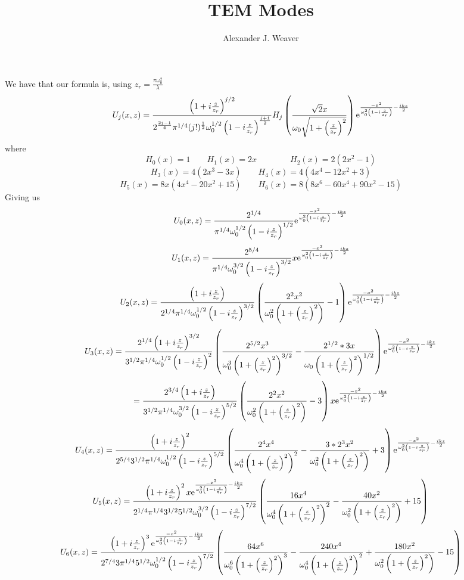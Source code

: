 \documentclass[11pt]{amsart}
\title{TEM Modes}
\author{Alexander J. Weaver}
\date{}                 		  %
\makeatletter
\newcommand{\e}{{\rm e}}				%
\newcommand{\0}{\varnothing}		%
\newcommand{\1}{!}
\newcommand{\2}{@}
\newcommand{\3}{\#}
\newcommand{\4}{\$}
\newcommand{\5}{\%}
\newcommand{\6}{$^\wedge$}
\newcommand{\7}{\&}
\newcommand{\8}{*}
\newcommand{\9}{(}
\makeatother
\begin{document}
\maketitle
We have that our formula is, using $z_r = \frac{\pi\omega_0^2}{\lambda}$
\[
U_j(x,z) = \frac{\left(1+i\frac{z}{z_r}\right)^{j/2}}{2^{\frac{2j-1}{4}}\pi^{1/4}(j!)^{\frac{1}{2}}\omega_0^{1/2}\left(1-i\frac{z}{z_r}\right)^{\frac{j+1}{2}}}H_j\left(\frac{\sqrt{2}x}{\omega_0\sqrt{1+\left(\frac{z}{z_r}\right)^2}}\right)\e^{\frac{-x^2}{\omega_0^2\left(1-i\frac{z}{z_r}\right)}-\frac{ikz}{2}}
\]
where
\[
H_0(x) = 1\qquad H_1(x) = 2x\qquad \qquad H_2(x) = 2\left(2x^2-1\right)
\]
\[
H_3(x) = 4\left(2x^3-3x\right)\qquad H_4(x) = 4\left(4x^4-12x^2+3\right)
\]
\[
H_5(x) = 8x\left(4x^4-20x^2+15\right)\qquad H_6(x) = 8(8x^6 - 60x^4+90x^2-15)
\]
Giving us
\[
U_0(x,z) = \frac{2^{1/4}}{\pi^{1/4}\omega_0^{1/2}\left(1-i\frac{z}{z_r}\right)^{1/2}}\e^{\frac{-x^2}{\omega_0^2\left(1-i\frac{z}{z_r}\right)}-\frac{ikz}{2}}
\]
\[
 U_1(x,z) =\frac{2^{5/4}}{\pi^{1/4}\omega_0^{3/2}\left(1-i\frac{z}{z_r}\right)^{3/2}}x\e^{\frac{-x^2}{\omega_0^2\left(1-i\frac{z}{z_r}\right)}-\frac{ikz}{2}}
\]
\[
U_2(x,z) = \frac{\left(1+i\frac{z}{z_r}\right)}{2^{1/4}\pi^{1/4}\omega_0^{1/2}\left(1-i\frac{z}{z_r}\right)^{3/2}}\left(\frac{2^2x^2}{\omega_0^2\left(1+\left(\frac{z}{z_r}\right)^2\right)}-1\right)\e^{\frac{-x^2}{\omega_0^2\left(1-i\frac{z}{z_r}\right)}-\frac{ikz}{2}}
\]
\[
U_3(x,z)=\frac{2^{1/4}\left(1+i\frac{z}{z_r}\right)^{3/2}}{3^{1/2}\pi^{1/4}\omega_0^{1/2}\left(1-i\frac{z}{z_r}\right)^2}\left(\frac{2^{5/2}x^3}{\omega_0^3\left(1+\left(\frac{z}{z_r}\right)^2\right)^{3/2}}-\frac{2^{1/2}*3x}{\omega_0\left(1+\left(\frac{z}{z_r}\right)^2\right)^{1/2}}\right)\e^{\frac{-x^2}{\omega_0^2\left(1-i\frac{z}{z_r}\right)}-\frac{ikz}{2}}
\]
\[
=\frac{2^{3/4}\left(1+i\frac{z}{z_r}\right)}{3^{1/2}\pi^{1/4}\omega_0^{3/2}\left(1-i\frac{z}{z_r}\right)^{5/2}}\left(\frac{2^2x^2}{\omega_0^2\left(1+\left(\frac{z}{z_r}\right)^2\right)}-3\right)x\e^{\frac{-x^2}{\omega_0^2\left(1-i\frac{z}{z_r}\right)}-\frac{ikz}{2}}
\]
\[
U_4(x,z) = \frac{\left(1+i\frac{z}{z_r}\right)^2}{2^{5/4}3^{1/2}\pi^{1/4}\omega_0^{1/2}\left(1-i\frac{z}{z_r}\right)^{5/2}}\left(\frac{2^4x^4}{\omega_0^4\left(1+\left(\frac{z}{z_r}\right)^2\right)^2}-\frac{3*2^3x^2}{\omega_0^2\left(1+\left(\frac{z}{z_r}\right)^2\right)}+3\right)\e^{\frac{-x^2}{\omega_0^2\left(1-i\frac{z}{z_r}\right)}-\frac{ikz}{2}}
\]
\[
U_5(x,z) = \frac{\left(1+i\frac{z}{z_r}\right)^{2}x\e^{\frac{-x^2}{\omega_0^2\left(1-i\frac{z}{z_r}\right)}-\frac{ikz}{2}}}{2^{1/4}\pi^{1/4}3^{1/2}5^{1/2}\omega_0^{3/2}\left(1-i\frac{z}{z_r}\right)^{7/2}}\left(\frac{16x^4}{\omega_0^4\left(1+\left(\frac{z}{z_r}\right)^2\right)^2}-\frac{40x^2}{\omega_0^2\left(1+\left(\frac{z}{z_r}\right)^2\right)}+15\right)
\]
\[
U_6(x,z) = \frac{\left(1+i\frac{z}{z_r}\right)^3\e^{\frac{-x^2}{\omega_0^2\left(1-i\frac{z}{z_r}\right)}-\frac{ikz}{2}}}{2^{7/4}3\pi^{1/4}5^{1/2}\omega_0^{1/2}\left(1-i\frac{z}{z_r}\right)^{7/2}}\left(\frac{64x^6}{\omega_0^6\left(1+\left(\frac{z}{z_r}\right)^2\right)^3}-\frac{240x^4}{\omega_0^4\left(1+\left(\frac{z}{z_r}\right)^2\right)^2}+\frac{180x^2}{\omega_0^2\left(1+\left(\frac{z}{z_r}\right)^2\right)}-15\right)
\]
\end{document}
